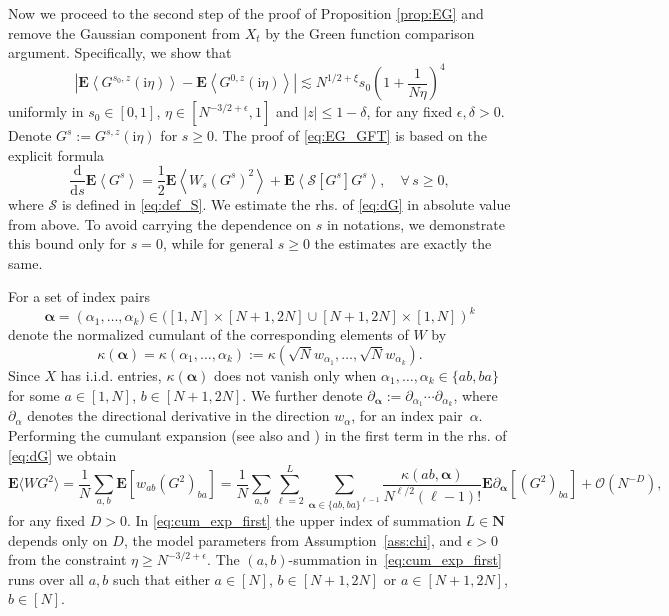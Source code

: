 \documentclass[10pt]{amsart}
\numberwithin{equation}{section}
\newcommand{\dif}{\mathrm{d}}
\newcommand{\E}{\mathbf{E}}
\newcommand{\N}{\mathbf{N}}
\newcommand{\ii}{\mathrm{i}}
\begin{document}
Now we proceed to the second step of the proof of Proposition \ref{prop:EG} and remove the Gaussian component from $X_t$ by the Green function comparison argument. Specifically, we show that
\begin{equation}
\left\vert\E \left\langle G^{s_0,z}(\ii\eta)\right\rangle-\E\left\langle G^{0,z}(\ii\eta)\right\rangle\right\vert \lesssim N^{1/2+\xi}s_0 \left(1+\frac{1}{N\eta}\right)^4
\label{eq:EG_GFT}
\end{equation}
uniformly in $s_0\in [0,1]$, $\eta\in [N^{-3/2+\epsilon},1]$ and $|z|\le 1-\delta$, for any fixed $\epsilon,\delta>0$. Denote $G^s:=G^{s,z}(\ii\eta)$ for $s\ge 0$. The proof of \eqref{eq:EG_GFT} is based on the explicit formula
\begin{equation}
\frac{\dif}{\dif s} \E \left\langle G^{s}\right\rangle = \frac{1}{2} \E\left\langle W_s\left(G^{s}\right)^2\right\rangle +\E\left\langle \mathcal{S}[G^{s}]G^{s}\right\rangle,\quad \forall \, s\ge 0,
\label{eq:dG}
\end{equation}
where $\mathcal{S}$ is defined in \eqref{eq:def_S}. We estimate the rhs. of \eqref{eq:dG} in absolute value from above. To avoid carrying the dependence on $s$ in notations, we demonstrate this bound only for $s=0$, while for general $s\ge 0$ the estimates are exactly the same. 

For a set of index pairs
\begin{equation}
\bm{\alpha}=\left(\alpha_1,\ldots,\alpha_k)\in([1,N]\times [N+1,2N]\cup [N+1,2N]\times [1,N]\right)^k
\label{eq:def_index_set}
\end{equation}
denote the normalized cumulant of the corresponding elements of $W$ by
\begin{equation}
\kappa(\bm{\alpha})=\kappa(\alpha_1,\ldots,\alpha_k):=\kappa(\sqrt{N}w_{\alpha_1},\ldots,\sqrt{N}w_{\alpha_k}).
\label{eq:def_cum}
\end{equation}
Since $X$ has i.i.d. entries, $\kappa(\bm{\alpha})$ does not vanish only when $\alpha_1,\ldots,\alpha_k\in\{ab,ba\}$ for some $a\in[1,N]$, $b\in [N+1,2N]$. We further denote $\partial_{\bm{\alpha}}:=\partial_{\alpha_1}\cdots\partial_{\alpha_k}$, where $\partial_{\alpha}$ denotes the directional derivative in the direction $w_{\alpha}$, for an index pair~$\alpha$. Performing the cumulant expansion \cite[Lemma~3.2]{Knowles20} (see also \cite[Lemma~3.1]{HeKnowles} and \cite[Section~II]{Khorunzhy96}) in the first term in the rhs. of \eqref{eq:dG} we obtain
\begin{equation}
\E \langle WG^2\rangle =\frac{1}{N}\sum_{a,b} \E\left[w_{ab}(G^2)_{ba}\right]= \frac{1}{N}\sum_{a,b}\sum_{\ell=2}^L\sum_{\bm{\alpha}\in\{ab,ba\}^{\ell-1}}\frac{\kappa(ab,\bm{\alpha})}{N^{\ell/2}(\ell-1)!}\E\partial_{\bm{\alpha}}\left[ (G^2)_{ba}\right] + \mathcal{O}(N^{-D}),
\label{eq:cum_exp_first}
\end{equation}
for any fixed $D>0$. In \eqref{eq:cum_exp_first} the upper index of summation $L\in \N$ depends only on $D$, the model parameters from Assumption~\ref{ass:chi}, and $\epsilon>0$ from the constraint $\eta\ge N^{-3/2+\epsilon}$. The $(a,b)$-summation in~\eqref{eq:cum_exp_first} runs over all $a,b$ such that either $a\in [N]$, $b\in [N+1,2N]$ or $a\in [N+1,2N]$, $b\in [N]$. 
\end{document}
